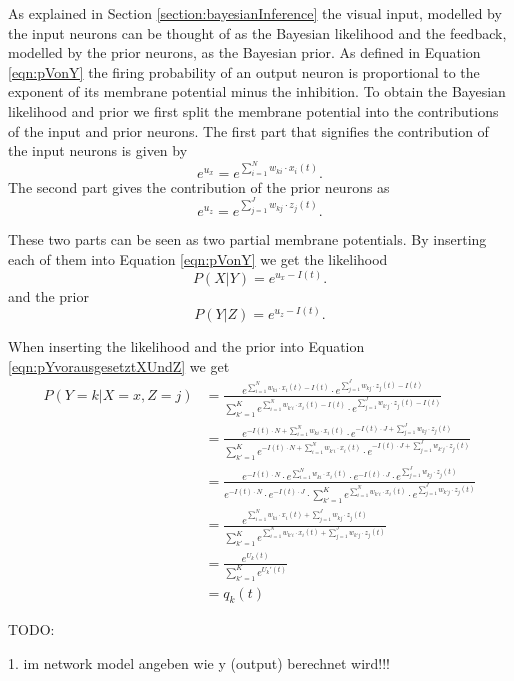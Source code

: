 As explained in Section \ref{section:bayesianInference} the visual input, modelled by the input neurons can be thought of as the Bayesian likelihood and the feedback, modelled by the prior neurons, as the Bayesian prior. As defined in Equation \ref{eqn:pVonY} the firing probability of an output neuron is proportional to the exponent of its membrane potential minus the inhibition. To obtain the Bayesian likelihood and prior we first split the membrane potential into the contributions of the input and prior neurons. The first part that signifies the contribution of the input neurons is given by
\begin{equation}
e^{u_x} = e^{\sum_{i=1}^N w_{ki} \cdot x_i(t)}.
\end{equation}
The second part gives the contribution of the prior neurons as
\begin{equation}
e^{u_z} = e^{\sum_{j=1}^J w_{kj} \cdot z_j(t)}.
\end{equation}

These two parts can be seen as two partial membrane potentials. By inserting each of them into Equation \ref{eqn:pVonY} we get the likelihood
\begin{equation}
P(X|Y) = e^{u_x - I(t)}.
\end{equation}
and the prior
\begin{equation}
P(Y|Z) = e^{u_z - I(t)}.
\end{equation}

When inserting the likelihood and the prior into Equation \ref{eqn:pYvorausgesetztXUndZ} we get
\begin{equation}
\begin{split}
P(Y=k|X=x,Z=j) &= \frac{e^{\sum_{i=1}^N w_{ki} \cdot x_i(t) - I(t)} \cdot e^{\sum_{j=1}^J w_{kj} \cdot z_j(t) - I(t)}}{\sum_{k'=1}^K  e^{\sum_{i=1}^N w_{k'i} \cdot x_i(t) - I(t)} \cdot e^{\sum_{j=1}^J w_{k'j} \cdot z_j(t) - I(t)}}\\

&= \frac{e^{-I(t) \cdot N + \sum_{i=1}^N w_{ki} \cdot x_i(t)} \cdot e^{-I(t) \cdot J + \sum_{j=1}^J w_{kj} \cdot z_j(t)}}{\sum_{k'=1}^K  e^{-I(t) \cdot N + \sum_{i=1}^N w_{k'i} \cdot x_i(t)} \cdot e^{-I(t) \cdot J + \sum_{j=1}^J w_{k'j} \cdot z_j(t)}}\\

&= \frac{e^{-I(t) \cdot N} \cdot e^{\sum_{i=1}^N w_{ki} \cdot x_i(t)} \cdot e^{-I(t) \cdot J} \cdot e^{\sum_{j=1}^J w_{kj} \cdot z_j(t)}}{e^{-I(t) \cdot N} \cdot e^{-I(t) \cdot J} \cdot \sum_{k'=1}^K  e^{\sum_{i=1}^N w_{k'i} \cdot x_i(t)} \cdot e^{\sum_{j=1}^J w_{k'j} \cdot z_j(t)}}\\

&= \frac{e^{\sum_{i=1}^N w_{ki} \cdot x_i(t) + \sum_{j=1}^J w_{kj} \cdot z_j(t)}}{\sum_{k'=1}^K  e^{\sum_{i=1}^N w_{k'i} \cdot x_i(t) + \sum_{j=1}^J w_{k'j} \cdot z_j(t)}}\\
&= \frac{e^{U_k(t)}}{\sum_{k'=1}^K e^{U_k'(t)}}\\
&= q_k(t)
\end{split}
\end{equation}


TODO:

1. im network model angeben wie y (output) berechnet wird!!!



